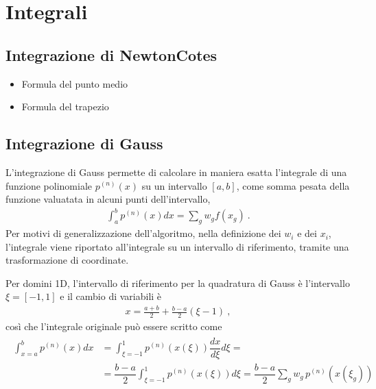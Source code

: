 \documentclass[letterpaper,10pt,english]{jupyterBook}
\begin{document}
\section{Integrali}
\label{\detokenize{ch/numerics/integrals:integrali}}\label{\detokenize{ch/numerics/integrals::doc}}

\subsection{Integrazione di Newton\sphinxhyphen{}Cotes}
\label{\detokenize{ch/numerics/integrals:integrazione-di-newton-cotes}}\begin{itemize}
\item {} 
\sphinxAtStartPar
Formula del punto medio

\item {} 
\sphinxAtStartPar
Formula del trapezio

\end{itemize}


\subsection{Integrazione di Gauss}
\label{\detokenize{ch/numerics/integrals:integrazione-di-gauss}}
\sphinxAtStartPar
L’integrazione di Gauss permette di calcolare in maniera esatta l’integrale di una funzione polinomiale \(p^(n)(x)\) su un intervallo \([a,b]\), come somma pesata della funzione valuatata in alcuni punti dell’intervallo,
\begin{equation*}
\begin{split}\int_a^b p^{(n)}(x) dx = \sum_{g} w_g f(x_g) \ .\end{split}
\end{equation*}
\sphinxAtStartPar
Per motivi di generalizzazione dell’algoritmo, nella definizione dei  \(w_i\) e dei  \(x_i\), l’integrale viene riportato all’integrale su un intervallo di riferimento, tramite una trasformazione di coordinate.

\sphinxAtStartPar
Per domini 1D, l’intervallo di riferimento per la quadratura di Gauss è l’intervallo \(\xi = [-1, 1]\) e il cambio di variabili è
\begin{equation*}
\begin{split}x = \frac{a+b}{2} + \frac{b-a}{2}(\xi - 1) \ ,\end{split}
\end{equation*}
\sphinxAtStartPar
così che l’integrale originale può essere scritto come
\begin{equation*}
\begin{split}\begin{aligned}
\int_{x=a}^b p^{(n)}(x) dx & = \int_{\xi = -1}^{1} p^(n) (x(\xi)) \dfrac{d x}{d\xi} d \xi = \\
 & = \dfrac{b-a}{2} \int_{\xi=-1}^{1} p^{(n)}(x(\xi)) d \xi = \dfrac{b-a}{2} \sum_{g} w_g \, p^{(n)}\left(x(\xi_g)\right)
\end{aligned}\end{split}
\end{equation*}
\sphinxstepscope
\end{document}
